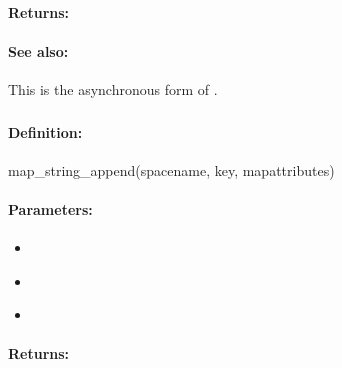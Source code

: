 \paragraph{Returns:}


\paragraph{See also:}  This is the asynchronous form of .

\pagebreak
\subsubsection{}
\label{api:ruby:map_string_append}


\paragraph{Definition:}
\begin{rubycode}
map_string_append(spacename, key, mapattributes)
\end{rubycode}

\paragraph{Parameters:}
\begin{itemize}[noitemsep]
\item {}\\

\item {}\\

\item {}\\

\end{itemize}

\paragraph{Returns:}


\pagebreak
\subsubsection{}
\label{api:ruby:async_map_string_append}


